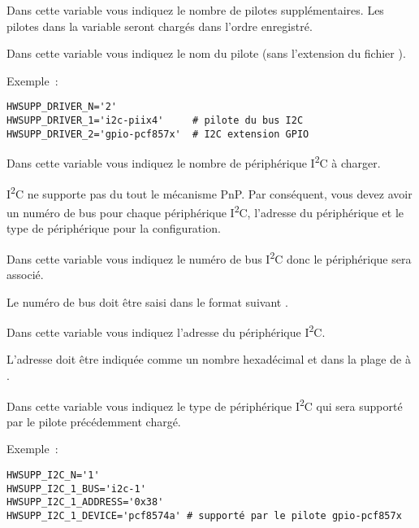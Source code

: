\begin{description}

  Dans cette variable vous indiquez le nombre de pilotes supplémentaires.
  Les pilotes dans la variable  seront chargés dans l'ordre
  enregistré.


  Dans cette variable vous indiquez le nom du pilote (sans l'extension du fichier ).

Exemple~:
\begin{verbatim}
HWSUPP_DRIVER_N='2'
HWSUPP_DRIVER_1='i2c-piix4'     # pilote du bus I2C
HWSUPP_DRIVER_2='gpio-pcf857x'  # I2C extension GPIO
\end{verbatim}


  Dans cette variable vous indiquez le nombre de périphérique
  I\textsuperscript{2}C à charger.

I\textsuperscript{2}C ne supporte pas du tout le mécanisme PnP.
  Par conséquent, vous devez avoir un numéro de bus pour chaque
  périphérique I\textsuperscript{2}C, l'adresse du périphérique et
  le type de périphérique pour la configuration.


  Dans cette variable vous indiquez le numéro de bus I\textsuperscript{2}C
  donc le périphérique sera associé.

  Le numéro de bus doit être saisi dans le format suivant .


  Dans cette variable vous indiquez l'adresse du périphérique I\textsuperscript{2}C.

  L'adresse doit être indiquée comme un nombre hexadécimal et dans la plage de
   à .


  Dans cette variable vous indiquez le type de périphérique I\textsuperscript{2}C
  qui sera supporté par le pilote précédemment chargé.

Exemple~:
\begin{verbatim}
HWSUPP_I2C_N='1'
HWSUPP_I2C_1_BUS='i2c-1'
HWSUPP_I2C_1_ADDRESS='0x38'
HWSUPP_I2C_1_DEVICE='pcf8574a' # supporté par le pilote gpio-pcf857x
\end{verbatim}


\end{description}
